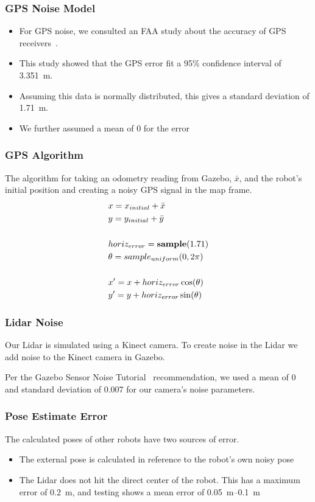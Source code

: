 \documentclass[14pt]{beamer}
\begin{document}
\begin{frame}
\frametitle{GPS Noise Model}
\begin{itemize}
\item For GPS noise, we consulted an FAA study about the accuracy of GPS receivers~\cite{FAAGPS}.
\item This study showed that the GPS error fit a 95\% confidence interval of \SI{3.351}{\meter}.
\item Assuming this data is normally distributed, this gives a standard deviation of \SI{1.71}{\meter}.
\item We further assumed a mean of 0 for the error
\end{itemize}


\end{frame}
\begin{frame}
\frametitle{GPS Algorithm}
The algorithm for taking an odometry reading from Gazebo, $\bar{x}$, and the robot's initial position and creating a noisy GPS signal in the map frame.
\begin{align}
&x = x_{initial} + \bar{x}\\
&y = y_{initial} + \bar{y}\\
\notag \\
&horiz_{error} = \textbf{sample}(1.71)\\
&\theta = \textbf{$sample_{uniform}$}(0, 2\pi)\\
\notag \\
&x' = x + horiz_{error}\cos(\theta)\\
&y' = y + horiz_{error}\sin(\theta)
\end{align}
\end{frame}

\begin{frame}
\frametitle{Lidar Noise}
Our Lidar is simulated using a Kinect camera. To create noise in the Lidar we add noise to the Kinect camera in Gazebo.

\vspace{14pt}
Per the Gazebo Sensor Noise Tutorial~\cite{GazeboSensorNoise} recommendation, we used a mean of 0 and standard deviation of 0.007 for our camera's noise parameters.
\end{frame}

\begin{frame}
\frametitle{Pose Estimate Error}
The calculated poses of other robots have two sources of error.
\begin{itemize}
\item The external pose is calculated in reference to the robot's own noisy pose
\item The Lidar does not hit the direct center of the robot. This has a maximum error of \SI{0.2}{\meter}, and testing shows a mean error of \SIrange{0.05}{0.1}{\meter}
\end{itemize}
\end{frame}
\end{document}
